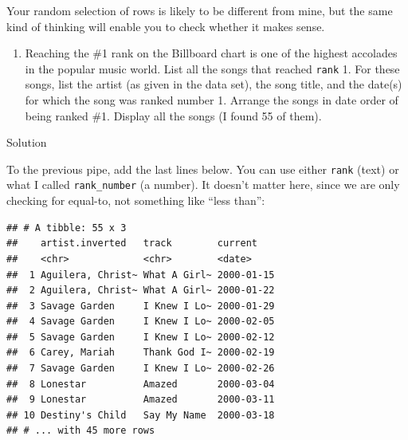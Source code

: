 \documentclass[]{tufte-book}
\newenvironment{Shaded}{}{}
\newcommand{\DataTypeTok}[1]{\textcolor[rgb]{0.56,0.13,0.00}{#1}}
\newcommand{\DecValTok}[1]{\textcolor[rgb]{0.25,0.63,0.44}{#1}}
\newcommand{\KeywordTok}[1]{\textcolor[rgb]{0.00,0.44,0.13}{\textbf{#1}}}
\newcommand{\NormalTok}[1]{#1}
\newcommand{\OperatorTok}[1]{\textcolor[rgb]{0.40,0.40,0.40}{#1}}
\newcommand{\StringTok}[1]{\textcolor[rgb]{0.25,0.44,0.63}{#1}}
\providecommand{\tightlist}{%
  \setlength{\itemsep}{0pt}\setlength{\parskip}{0pt}}
\theoremstyle{definition}
\theoremstyle{definition}
\theoremstyle{definition}
\theoremstyle{remark}
\begin{document}
Your random selection of rows is likely to be different from mine, but
the same kind of thinking will enable you to check whether it makes
sense.

\begin{enumerate}
\def\labelenumi{(\alph{enumi})}
\setcounter{enumi}{5}
\tightlist
\item
  Reaching the \#1 rank on the Billboard chart is one of the highest
  accolades in the popular music world. List all the songs that reached
  \texttt{rank} 1. For these songs, list the artist (as given in the
  data set), the song title, and the date(s) for which the song was
  ranked number 1. Arrange the songs in date order of being ranked \#1.
  Display all the songs (I found 55 of them).
\end{enumerate}

Solution

To the previous pipe, add the last lines below. You can use either
\texttt{rank} (text) or what I called \texttt{rank\_number} (a number).
It doesn't matter here, since we are only checking for equal-to, not
something like ``less than'':

\begin{Shaded}
\end{Shaded}

\begin{verbatim}
## # A tibble: 55 x 3
##    artist.inverted   track        current   
##    <chr>             <chr>        <date>    
##  1 Aguilera, Christ~ What A Girl~ 2000-01-15
##  2 Aguilera, Christ~ What A Girl~ 2000-01-22
##  3 Savage Garden     I Knew I Lo~ 2000-01-29
##  4 Savage Garden     I Knew I Lo~ 2000-02-05
##  5 Savage Garden     I Knew I Lo~ 2000-02-12
##  6 Carey, Mariah     Thank God I~ 2000-02-19
##  7 Savage Garden     I Knew I Lo~ 2000-02-26
##  8 Lonestar          Amazed       2000-03-04
##  9 Lonestar          Amazed       2000-03-11
## 10 Destiny's Child   Say My Name  2000-03-18
## # ... with 45 more rows
\end{verbatim}
\end{document}
